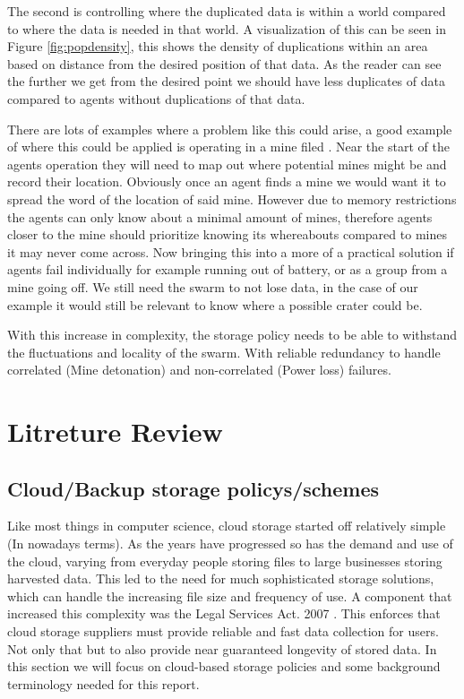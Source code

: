 \documentclass{UoYCSproject}
\begin{document}
The second is controlling where the duplicated data is within a world compared to where the data is needed in that world. 
A visualization of this can be seen in Figure \ref{fig:popdensity}, this shows the density of duplications within an area based on distance from the desired position of that data. 
As the reader can see the further we get from the desired point we should have less duplicates of data compared to agents without duplications of that data.

There are lots of examples where a problem like this could arise, a good example of where this could be applied is operating in a mine filed \cite{Cognitive maps mine detection}. 
Near the start of the agents operation they will need to map out where potential mines might be and record their location. 
Obviously once an agent finds a mine we would want it to spread the word of the location of said mine. 
However due to memory restrictions the agents can only know about a minimal amount of mines, therefore agents closer to the mine should prioritize knowing its whereabouts compared to mines it may never come across. 
Now bringing this into a more of a practical solution if agents fail individually for example running out of battery, or as a group from a mine going off. 
We still need the swarm to not lose data, in the case of our example it would still be relevant to know where a possible crater could be.

With this increase in complexity, the storage policy needs to be able to withstand the fluctuations and locality of the swarm. 
With reliable redundancy to handle correlated (Mine detonation) and non-correlated (Power loss) failures.

\chapter{Litreture Review}
\label{cha:Litreture Review}

\section{Cloud/Backup storage policys/schemes}
\label{sec:Cloud}

Like most things in computer science, cloud storage started off relatively simple (In nowadays terms). 
As the years have progressed so has the demand and use of the cloud, varying from everyday people storing files to large businesses storing harvested data. 
This led to the need for much sophisticated storage solutions, which can handle the increasing file size and frequency of use. 
A component that increased this complexity was the Legal Services Act. 2007 \cite{LSA}. 
This enforces that cloud storage suppliers must provide reliable and fast data collection for users. 
Not only that but to also provide near guaranteed longevity of stored data.
In this section we will focus on cloud-based storage policies and some background terminology needed for this report.
\end{document}
